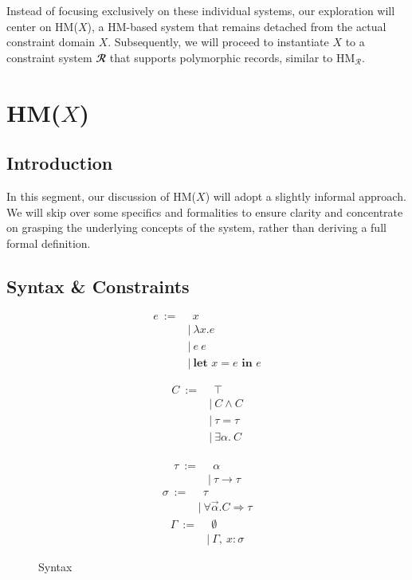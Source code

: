\documentclass[runningheads]{llncs}
\newcommand{\hmx}{HM($X$)}
\newcommand{\kwlet}{\textbf{let }}
\newcommand{\kwin}{\textbf{ in }}
\begin{document}
Instead of focusing exclusively on these individual systems, our
exploration
will center on \hmx{}, a HM-based system that remains detached from
the actual constraint domain $X$.
Subsequently, we will proceed to instantiate $X$ to a constraint system
$𝓡$
that supports polymorphic records, similar to HM$_\mathcal{R}$.

\section{\hmx{}}

\subsection{Introduction}
In this segment, our discussion of \hmx{} will adopt a slightly informal
approach.
We will skip over some specifics and formalities to ensure clarity and
concentrate on
grasping the underlying concepts of the system, rather than deriving a
full
formal definition.

\subsection{Syntax \& Constraints}
\begin{figure}[t]
  \centering
  \begin{subfigure}[t]{0.3\textwidth}
    \begin{align*}
      e \ := & \ \ x                    \\
             & | \ λx. e                \\
             & | \ e \ e                \\
             & | \ \kwlet x = e \kwin e
    \end{align*}
  \end{subfigure}
  \begin{subfigure}[t]{0.3\textwidth}
    \begin{align*}
      C \ := & \ \ ⊤       \\
             & | \ C ∧ C   \\
             & | \ τ = τ   \\
             & | \ ∃α. \ C \\
    \end{align*}
  \end{subfigure}
  \begin{subfigure}[t]{0.3\textwidth}
    \begin{align*}
      τ \ := & \ \ α     \\
             & | \ τ → τ
    \end{align*}
    \begin{align*}
      σ \ := & \ \ τ             \\
             & | \ ∀\Vec α.C ⇒ τ
    \end{align*}
    \begin{align*}
      Γ \ := & \ \ ∅           \\
             & | \ Γ , \ x : σ
    \end{align*}
  \end{subfigure}
  \caption{Syntax}
\end{figure}
\end{document}

